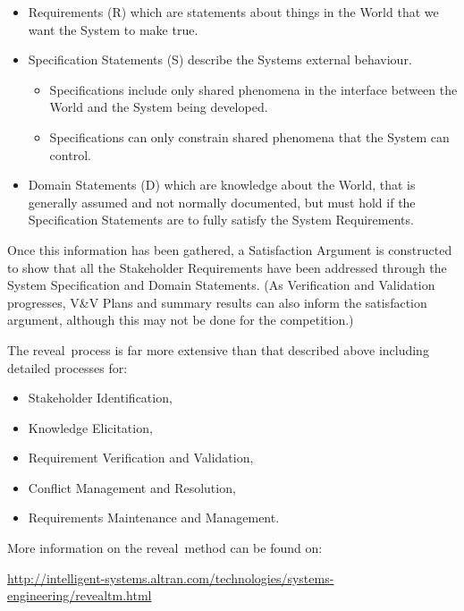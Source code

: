 \documentclass{report}
\newcommand{\reveal}[0]{{\sc reveal}\texttrademark}
\begin{document}
\begin{itemize}
\item Requirements (R) which are statements about things in the World
  that we want the System to make true.

\item Specification Statements (S) describe the Systems external
  behaviour.
  \begin{itemize}
  \item Specifications include only shared phenomena in the interface
    between the World and the System being developed.
  \item Specifications can only constrain shared phenomena that the
    System can control.
  \end{itemize}

\item Domain Statements (D) which are knowledge about the World, that
  is generally assumed and not normally documented, but must hold if
  the Specification Statements are to fully satisfy the System
  Requirements.
\end{itemize}

\noindent
Once this information has been gathered, a Satisfaction Argument is
constructed to show that all the Stakeholder Requirements have been
addressed through the System Specification and Domain Statements. (As
Verification and Validation progresses, V\&V Plans and summary results
can also inform the satisfaction argument, although this may not be
done for the competition.)

The \reveal\ process is far more extensive than that described above
including detailed processes for:

\begin{itemize}
\item Stakeholder Identification,
\item Knowledge Elicitation,
\item Requirement Verification and Validation,
\item Conflict Management and Resolution,
\item Requirements Maintenance and Management.
\end{itemize}

\noindent
More information on the \reveal\ method can be found on:
\begin{center}
  \scriptsize
  \url{http://intelligent-systems.altran.com/technologies/systems-engineering/revealtm.html}
\end{center}
\end{document}
